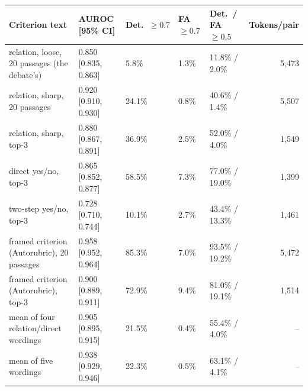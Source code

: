 \begin{tabular}{@{}lllllr@{}}
\toprule
Criterion text & AUROC [95\% CI] & Det.\ $\geq 0.7$ & FA $\geq 0.7$ & Det.\ / FA $\geq 0.5$ & Tokens/pair \\
\midrule
relation, loose, 20 passages (the debate's) & 0.850 [0.835, 0.863] & 5.8\% & 1.3\% & 11.8\% / 2.0\% & 5,473 \\
relation, sharp, 20 passages & 0.920 [0.910, 0.930] & 24.1\% & 0.8\% & 40.6\% / 1.4\% & 5,507 \\
relation, sharp, top-3 & 0.880 [0.867, 0.891] & 36.9\% & 2.5\% & 52.0\% / 4.0\% & 1,549 \\
direct yes/no, top-3 & 0.865 [0.852, 0.877] & 58.5\% & 7.3\% & 77.0\% / 19.0\% & 1,399 \\
two-step yes/no, top-3 & 0.728 [0.710, 0.744] & 10.1\% & 2.7\% & 43.4\% / 13.3\% & 1,461 \\
framed criterion (Autorubric), 20 passages & 0.958 [0.952, 0.964] & 85.3\% & 7.0\% & 93.5\% / 19.2\% & 5,472 \\
framed criterion (Autorubric), top-3 & 0.900 [0.889, 0.911] & 72.9\% & 9.4\% & 81.0\% / 19.1\% & 1,514 \\
mean of four relation/direct wordings & 0.905 [0.895, 0.915] & 21.5\% & 0.4\% & 55.4\% / 4.0\% & -- \\
mean of five wordings & 0.938 [0.929, 0.946] & 22.3\% & 0.5\% & 63.1\% / 4.1\% & -- \\
\bottomrule
\end{tabular}
